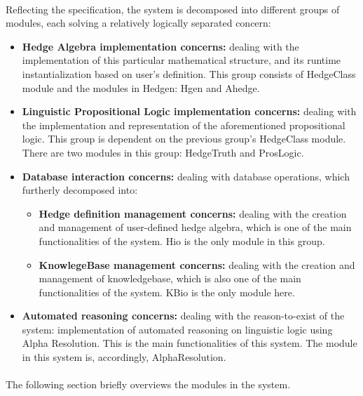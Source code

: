 \documentclass[../gr-final.tex]{subfiles}
\begin{document}
\paragraph{} Reflecting the specification, the system is decomposed
into different groups of modules, each solving a relatively logically separated
concern:
\begin{itemize}
\item {\bfseries Hedge Algebra implementation concerns:} dealing with
  the implementation of this particular mathematical structure, and
  its runtime instantialization based on user's definition. This
  group consists of HedgeClass module and the modules in Hedgen:
  Hgen and Ahedge.
\item {\bfseries Linguistic Propositional Logic implementation concerns:} dealing
  with the implementation and representation of the aforementioned
  propositional logic. This group is dependent on the previous group's
  HedgeClass module. There are two modules in this group: HedgeTruth
  and ProsLogic.
\item {\bfseries Database interaction concerns:} dealing with
        database operations, which furtherly decomposed into:
        \begin{itemize}
          \item {\bfseries Hedge definition management concerns:}
                  dealing with the creation and management of
                  user-defined hedge algebra, which is one of the
                  main functionalities of the system. Hio is the
                  only module in this group. 
          \item {\bfseries KnowlegeBase management concerns:}
                  dealing with the creation and management of
                  knowledgebase, which is also one of the main
                  functionalities of the system. KBio is the only
                  module here.
        \end{itemize}
\item {\bfseries Automated reasoning concerns:} dealing with the
  reason-to-exist of the system: implementation of automated reasoning
  on linguistic logic using Alpha Resolution. This is the main
  functionalities of this system. The module in this system is,
  accordingly, AlphaResolution.
\end{itemize}
\paragraph{} The following section briefly overviews the modules in
the system.
\end{document}
